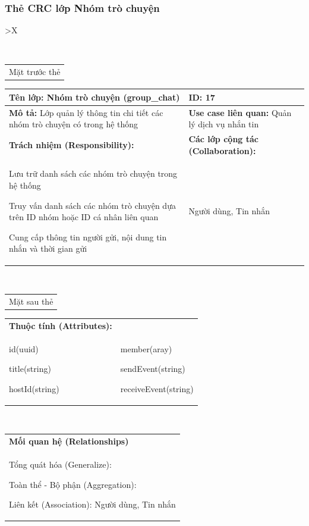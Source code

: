 \cleardoublepage

\subsubsection{Thẻ CRC lớp Nhóm trò chuyện}

\begin{xltabular}{\textwidth}{
		>{\centering\arraybackslash}X
	}
	\caption{\bfseries \fontsize{12pt}{0pt}\selectfont Thẻ CRC lớp Nhóm trò chuyện}
	\\
	\begin{tabularx}{0.9\textwidth}{X}
		Mặt trước thẻ
	\end{tabularx}
	\begin{tabularx}{0.9\textwidth}{|X|X|}
		\hline
		\textbf{Tên lớp:} Nhóm trò chuyện (group\_chat)                                      & \textbf{ID:} 17                                        \\
		\hline
		\textbf{Mô tả:} Lớp quản lý thông tin chi tiết các nhóm trò chuyện có trong hệ thống & \textbf{Use case liên quan:}  Quản lý dịch vụ nhắn tin \\
		\hline
		\textbf{Trách nhiệm (Responsibility):}                                               & \textbf{Các lớp cộng tác (Collaboration):}             \\
		Lưu trữ danh sách các nhóm trò chuyện trong hệ thống

		Truy vấn danh sách các nhóm trò chuyện dựa trên ID nhóm hoặc ID cá nhân liên quan

		Cung cấp thông tin người gửi, nội dung tin nhắn và thời gian gửi
		                                                                                     &
		Người dùng, Tin nhắn
		\\
		\hline
	\end{tabularx}
	\\
	\begin{tabularx}{0.9\textwidth}{X}
		Mặt sau thẻ
	\end{tabularx}
	\begin{tabularx}{0.9\textwidth}{|X|X|}
		\hline
		\textbf{Thuộc tính (Attributes):} & \\
		id(uuid)

		title(string)

		hostId(string)
		                                  &
		member(aray)

		sendEvent(string)

		receiveEvent(string)
		\\ \hline
	\end{tabularx}
	\\
	\begin{tabularx}{0.9\textwidth}{|X|}
		\hline
		\textbf{Mối quan hệ (Relationships)} \\
		Tổng quát hóa (Generalize):

		Toàn thể - Bộ phận (Aggregation):

		Liên kết (Association): Người dùng, Tin nhắn
		\\
		\hline
	\end{tabularx}
\end{xltabular}

